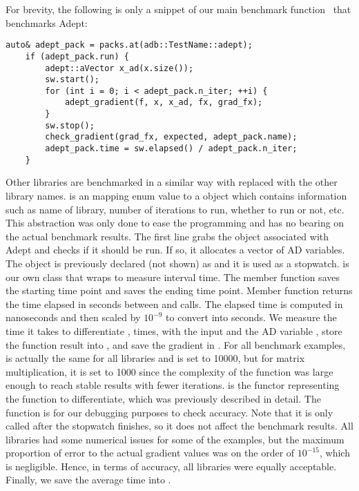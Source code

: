 For brevity, the following is only a snippet of our main
benchmark function~ that benchmarks Adept:
\begin{lstlisting}[style=customcpp]
    auto& adept_pack = packs.at(adb::TestName::adept);
    if (adept_pack.run) {
        adept::aVector x_ad(x.size());
        sw.start();
        for (int i = 0; i < adept_pack.n_iter; ++i) {
            adept_gradient(f, x, x_ad, fx, grad_fx);
        }
        sw.stop();
        check_gradient(grad_fx, expected, adept_pack.name);
        adept_pack.time = sw.elapsed() / adept_pack.n_iter;
    }
\end{lstlisting}
Other libraries are benchmarked in a similar way with  replaced with the other library names.
 is an  mapping  enum value to a  object
which contains information such as name of library, number of iterations to run, whether to run or not, etc.
This abstraction was only done to ease the programming and has no bearing on the actual benchmark results.
The first line grabs the  object associated with Adept and checks if it should be run.
If so, it allocates a vector of AD variables.
The object  is previously declared (not shown) as  and it is used as a stopwatch.
 is our own class that wraps  to measure interval time.
The member function  saves the starting time point and  saves the ending time point.
Member function  returns the time elapsed in seconds between  and  calls.
The elapsed time is computed in nanoseconds and then scaled by $10^{-9}$ to convert into seconds.
We measure the time it takes to differentiate ,  times,
with the input  and the AD variable ,
store the function result into , and save the gradient in .
For all benchmark examples,  is actually the same for all libraries and is set to 10000,
but for matrix multiplication, it is set to 1000 
since the complexity of the function was large enough to reach stable results with fewer iterations.
 is the functor representing the function to differentiate,
which was previously described in detail.
The function  is for our debugging purposes to check accuracy.
Note that it is only called after the stopwatch finishes, so it does not affect the benchmark results.
All libraries had some numerical issues for some of the examples,
but the maximum proportion of error to the actual gradient values was on the order of $ 10^{-15}$, which is negligible.
Hence, in terms of accuracy, all libraries were equally acceptable.
Finally, we save the average time into .

